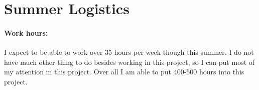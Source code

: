 \documentclass[a4paper,12pt,onecolumn]{article}
\begin{document}

\section{Summer Logistics} %
\label{sec:summer_logistics}

\paragraph{Work hours:} I expect to be able to work over 35 hours per week though this summer.
I do not have much other thing to do besides working in this project, so I can put most of my
attention in this project. Over all I am able to put 400-500 hours into this project.




\end{document}
